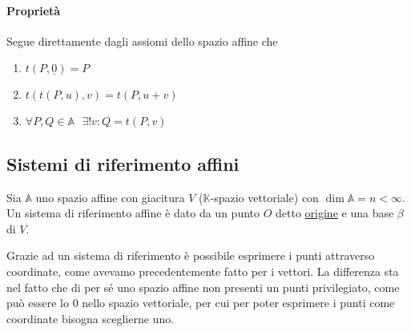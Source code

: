 \documentclass{article}     %
\let\undl\underline
\begin{document}
\paragraph*{Proprietà} Segue direttamente dagli assiomi dello spazio affine che 
\begin{enumerate}[label=$\roman*)$]
    \item $t(P,\underline{0})=P$
    \item $t(t(P,u),v)=t(P,u+v)$
    \item $\forall P,Q\in \mathbb{A}~~~\exists!v:Q=t(P,v)$
\end{enumerate}


\subsection{Sistemi di riferimento affini}
\begin{boxdef}
    Sia $\mathbb{A}$ uno spazio affine con giacitura $V$ ($\mathbb{K}$-spazio vettoriale) con $\dim \mathbb{A}=n<\infty$.
    Un sistema di riferimento affine è dato da un punto $O$ detto \undl{origine} e una base $\beta$ di $V$.
\end{boxdef}
Grazie ad un sistema di riferimento è possibile esprimere i punti attraverso coordinate, come avevamo precedentemente fatto per i vettori. La differenza sta nel fatto che di per sé uno spazio affine non presenti un punti privilegiato, come può essere lo $0$ nello spazio vettoriale, per cui per poter esprimere i punti come coordinate bisogna sceglierne uno.
\end{document}
